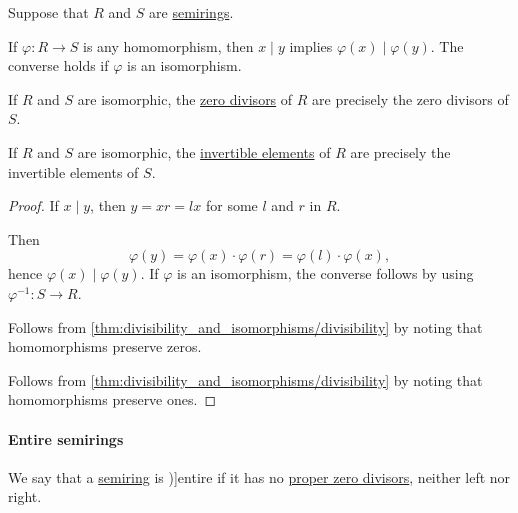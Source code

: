 \begin{proposition}\label{thm:divisibility_and_isomorphisms}
  Suppose that \( R \) and \( S \) are \hyperref[def:semiring]{semirings}.

  \begin{thmenum}
     If \( \varphi: R \to S \) is any homomorphism, then \( x \mid y \) implies \( \varphi(x) \mid \varphi(y) \). The converse holds if \( \varphi \) is an isomorphism.

     If \( R \) and \( S \) are isomorphic, the \hyperref[def:semiring_divisibility/zero]{zero divisors} of \( R \) are precisely the zero divisors of \( S \).

     If \( R \) and \( S \) are isomorphic, the \hyperref[def:semiring_divisibility/invertible]{invertible elements} of \( R \) are precisely the invertible elements of \( S \).
  \end{thmenum}
\end{proposition}
\begin{proof}
   If \( x \mid y \), then \( y = xr = lx \) for some \( l \) and \( r \) in \( R \).

  Then
  \begin{equation*}
    \varphi(y) = \varphi(x) \cdot \varphi(r) = \varphi(l) \cdot \varphi(x),
  \end{equation*}
  hence \( \varphi(x) \mid \varphi(y) \). If \( \varphi \) is an isomorphism, the converse follows by using \( \varphi^{-1}: S \to R \).

   Follows from \cref{thm:divisibility_and_isomorphisms/divisibility} by noting that homomorphisms preserve zeros.

   Follows from \cref{thm:divisibility_and_isomorphisms/divisibility} by noting that homomorphisms preserve ones.
\end{proof}

\paragraph{Entire semirings}

\begin{definition}\label{def:entire_semiring}
  We say that a \hyperref[def:semiring]{semiring} is \term[ru=целостное (кольцо) (\cite[def. 3.5.1]{Винберг2014КурсАлгебры})]{entire} if it has no \hyperref[def:semiring_divisibility]{proper zero divisors}, neither left nor right.
\end{definition}

